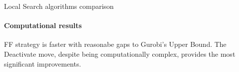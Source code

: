 \documentclass{beamer}
\begin{document}
\begin{frame}{Local Search algorithms comparison}
    \framesubtitle{Computational results}
    \begin{table}
        \centering
        \caption{Local Search Heuristics Comparison of Averages.}
        \label{tab:ls_improv_exp}
    \end{table}
    \small FF strategy is faster with reasonabe gaps to Gurobi's Upper Bound. The Deactivate move, despite being computationally complex, provides the most significant improvements.
\end{frame}
\end{document}
